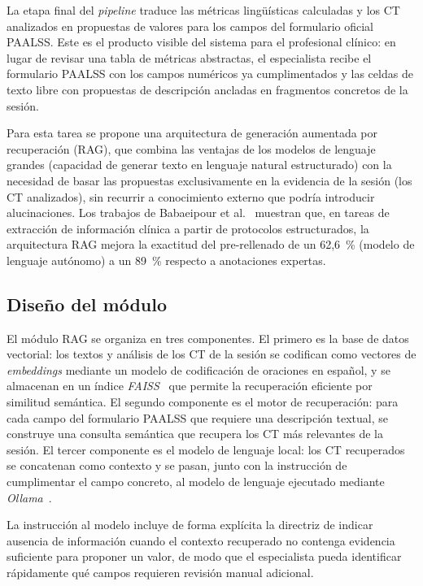 La etapa final del \emph{pipeline} traduce las métricas lingüísticas calculadas y los
\ac{CT} analizados en propuestas de valores para los campos del formulario oficial
\ac{PAALSS}. Este es el producto visible del sistema para el profesional clínico: en
lugar de revisar una tabla de métricas abstractas, el especialista recibe el formulario
\ac{PAALSS} con los campos numéricos ya cumplimentados y las celdas de texto libre con
propuestas de descripción ancladas en fragmentos concretos de la sesión.

Para esta tarea se propone una arquitectura de generación aumentada por recuperación
(\ac{RAG}), que combina las ventajas de los modelos de lenguaje grandes (capacidad de
generar texto en lenguaje natural estructurado) con la necesidad de basar las
propuestas exclusivamente en la evidencia de la sesión (los \ac{CT} analizados), sin
recurrir a conocimiento externo que podría introducir alucinaciones. Los trabajos de
Babaeipour et al.~\cite{clinical_nlp_ai_protocol} muestran que, en tareas de
extracción de información clínica a partir de protocolos estructurados, la arquitectura
\ac{RAG} mejora la exactitud del pre-rellenado de un 62{,}6~\% (modelo de lenguaje
autónomo) a un 89~\% respecto a anotaciones expertas.


\subsection{Diseño del módulo}
\label{subsec:rag_diseno}

El módulo \ac{RAG} se organiza en tres componentes. El primero es la base de datos
vectorial: los textos y análisis de los \ac{CT} de la sesión se codifican como
vectores de \emph{embeddings} mediante un modelo de codificación de oraciones en
español, y se almacenan en un índice \emph{FAISS}~\cite{faiss_johnson2021} que permite la
recuperación eficiente por similitud semántica. El segundo componente es el motor de
recuperación: para cada campo del formulario \ac{PAALSS} que requiere una descripción
textual, se construye una consulta semántica que recupera los \ac{CT} más relevantes de
la sesión. El tercer componente es el modelo de lenguaje local: los \ac{CT} recuperados
se concatenan como contexto y se pasan, junto con la instrucción de cumplimentar el
campo concreto, al modelo de lenguaje ejecutado mediante \emph{Ollama}~\cite{ollama}.

La instrucción al modelo incluye de forma explícita la directriz de indicar
ausencia de información cuando el contexto recuperado no contenga evidencia suficiente
para proponer un valor, de modo que el especialista pueda identificar rápidamente qué
campos requieren revisión manual adicional.

